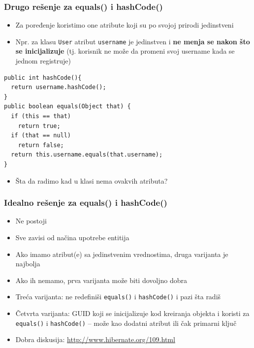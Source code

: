 \documentclass[compress]{beamer}
\begin{document}
\begin{frame}[fragile]
  \frametitle{Drugo rešenje za equals() i hashCode()}
  \begin{itemize}
    \item Za poređenje koristimo one atribute koji su po svojoj prirodi jedinstveni
    \item Npr. za klasu \texttt{User} atribut \texttt{username} je jedinstven i \textbf{ne menja se nakon što se inicijalizuje}
      (tj. korisnik ne može da promeni svoj username kada se jednom registruje)
  \end{itemize}
\begin{verbatim}
public int hashCode(){
  return username.hashCode();
}
public boolean equals(Object that) {
  if (this == that)
    return true;
  if (that == null)
    return false;
  return this.username.equals(that.username);
}
\end{verbatim}
  \begin{itemize}
    \item<2-> Šta da radimo kad u klasi nema ovakvih atributa?
  \end{itemize}
\end{frame}
\begin{frame}[fragile]
  \frametitle{Idealno rešenje za equals() i hashCode()}
  \begin{itemize}
    \item Ne postoji
    \item Sve zavisi od načina upotrebe entitija
    \item Ako imamo atribut(e) sa jedinstvenim vrednostima, druga varijanta je najbolja
    \item Ako ih nemamo, prva varijanta može biti dovoljno dobra
    \item Treća varijanta: ne redefiniši \texttt{equals()} i \texttt{hashCode()} i pazi šta radiš
    \item Četvrta varijanta: GUID koji se inicijalizuje kod kreiranja objekta i koristi za 
            \texttt{equals()} i \texttt{hashCode()} -- može kao dodatni atribut ili čak primarni ključ
    \item Dobra diskusija: \url{http://www.hibernate.org/109.html}
  \end{itemize}
\end{frame}
\end{document}
